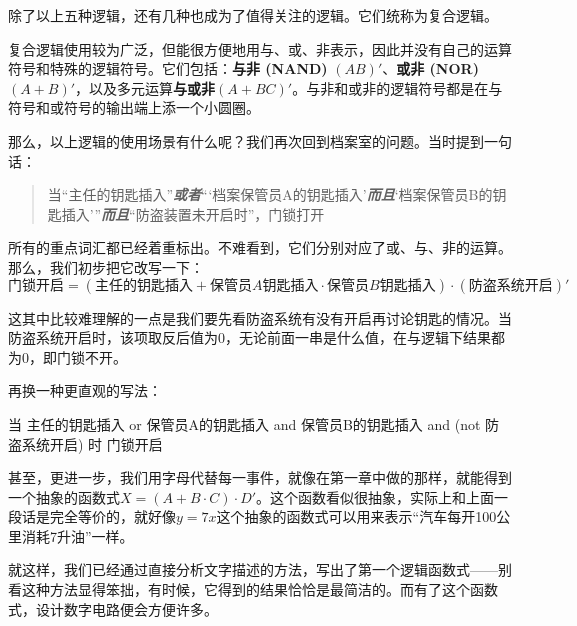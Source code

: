 \documentclass[UTF8]{ctexart}
\begin{document}
除了以上五种逻辑，还有几种也成为了值得关注的逻辑。它们统称为复合逻辑。

复合逻辑使用较为广泛，但能很方便地用与、或、非表示，因此并没有自己的运算符号和特殊的逻辑符号。它们包括：\textbf{与非 (NAND) }$(AB)'$、\textbf{或非 (NOR) }$(A+B)'$，以及多元运算\textbf{与或非}$(A+BC)'$。与非和或非的逻辑符号都是在与符号和或符号的输出端上添一个小圆圈。

那么，以上逻辑的使用场景有什么呢？我们再次回到档案室的问题。当时提到一句话：

\begin{quote}
当“主任的钥匙插入”\textbf{\textit{或者}}“‘档案保管员A的钥匙插入’\textbf{\textit{而且}}‘档案保管员B的钥匙插入’”\textbf{\textit{而且}}“防盗装置未开启时”，门锁打开
\end{quote}

所有的重点词汇都已经着重标出。不难看到，它们分别对应了或、与、非的运算。那么，我们初步把它改写一下：
\[门锁开启=(主任的钥匙插入+保管员A钥匙插入\cdot 保管员B钥匙插入)\cdot(防盗系统开启)'\]

这其中比较难理解的一点是我们要先看防盗系统有没有开启再讨论钥匙的情况。当防盗系统开启时，该项取反后值为0，无论前面一串是什么值，在与逻辑下结果都为0，即门锁不开。

再换一种更直观的写法：

\begin{code}
当
{
    主任的钥匙插入 or
    {
        保管员A的钥匙插入 and 保管员B的钥匙插入
    }
} and (not 防盗系统开启)
时
    门锁开启
\end{code}

甚至，更进一步，我们用字母代替每一事件，就像在第一章中做的那样，就能得到一个抽象的函数式$X=(A+B\cdot C)\cdot D'$。这个函数看似很抽象，实际上和上面一段话是完全等价的，就好像$y=7x$这个抽象的函数式可以用来表示“汽车每开100公里消耗7升油”一样。

就这样，我们已经通过直接分析文字描述的方法，写出了第一个逻辑函数式——别看这种方法显得笨拙，有时候，它得到的结果恰恰是最简洁的。而有了这个函数式，设计数字电路便会方便许多。
\end{document}
